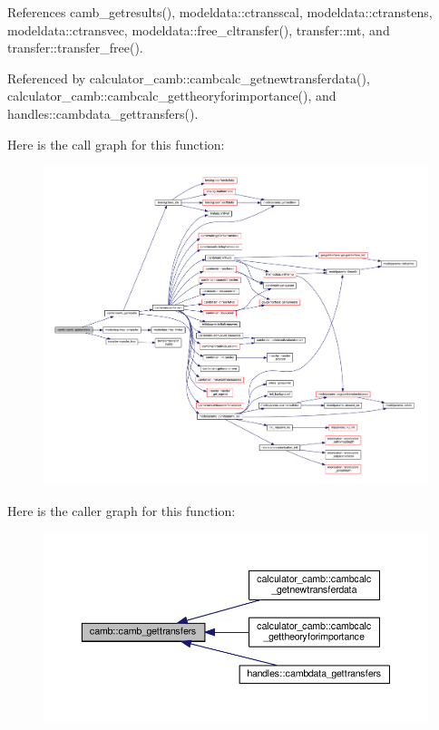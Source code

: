 References camb\+\_\+getresults(), modeldata\+::ctransscal, modeldata\+::ctranstens, modeldata\+::ctransvec, modeldata\+::free\+\_\+cltransfer(), transfer\+::mt, and transfer\+::transfer\+\_\+free().



Referenced by calculator\+\_\+camb\+::cambcalc\+\_\+getnewtransferdata(), calculator\+\_\+camb\+::cambcalc\+\_\+gettheoryforimportance(), and handles\+::cambdata\+\_\+gettransfers().

Here is the call graph for this function\+:
\nopagebreak
\begin{figure}[H]
\begin{center}
\leavevmode
\includegraphics[width=350pt]{namespacecamb_ae587b573e03da5811edb59806305b2cd_cgraph}
\end{center}
\end{figure}
Here is the caller graph for this function\+:
\nopagebreak
\begin{figure}[H]
\begin{center}
\leavevmode
\includegraphics[width=350pt]{namespacecamb_ae587b573e03da5811edb59806305b2cd_icgraph}
\end{center}
\end{figure}
\mbox{\label{namespacecamb_ab45910129412993d163c3d4b83e19152}} 
